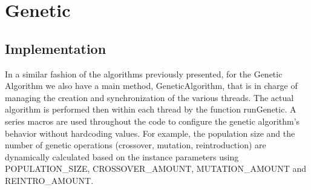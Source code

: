 \section{Genetic}
\subsection{Implementation}
In a similar fashion of the algorithms previously presented, for the Genetic Algorithm we also have a main method, GeneticAlgorithm, that is in 
charge of managing the creation and synchronization of the various threads. The actual algorithm is performed then within each thread by the function runGenetic.
A series macros are used throughout the code to configure the genetic algorithm's behavior without hardcoding values. For example, the population 
size and the number of genetic operations (crossover, mutation, reintroduction) are dynamically calculated based on the instance parameters using 
POPULATION_SIZE, CROSSOVER_AMOUNT, MUTATION_AMOUNT and REINTRO_AMOUNT. 
